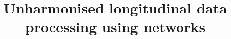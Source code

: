 \documentclass[10pt,letterpaper]{article}
\begin{document}
\pagestyle{empty}
\listoftodos[TODO]
\newpage


\doublespacing
\title{Unharmonised longitudinal data processing using networks}
\author{}
\maketitle







\end{document}
